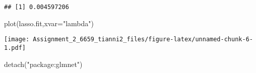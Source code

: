 \documentclass[
]{article}
\newenvironment{Shaded}{\begin{snugshade}}{\end{snugshade}}
\newcommand{\AttributeTok}[1]{\textcolor[rgb]{0.77,0.63,0.00}{#1}}
\newcommand{\FunctionTok}[1]{\textcolor[rgb]{0.00,0.00,0.00}{#1}}
\newcommand{\NormalTok}[1]{#1}
\newcommand{\StringTok}[1]{\textcolor[rgb]{0.31,0.60,0.02}{#1}}
\begin{document}
\begin{verbatim}
## [1] 0.004597206
\end{verbatim}

\begin{Shaded}
\begin{Highlighting}[]
\FunctionTok{plot}\NormalTok{(lasso.fit,}\AttributeTok{xvar=}\StringTok{"lambda"}\NormalTok{)}
\end{Highlighting}
\end{Shaded}

\texttt{[image: Assignment\_2\_6659\_tianni2\_files/figure-latex/unnamed-chunk-6-1.pdf]}

\begin{Shaded}
\begin{Highlighting}[]
\FunctionTok{detach}\NormalTok{(}\StringTok{"package:glmnet"}\NormalTok{)}
\end{Highlighting}
\end{Shaded}
\end{document}
